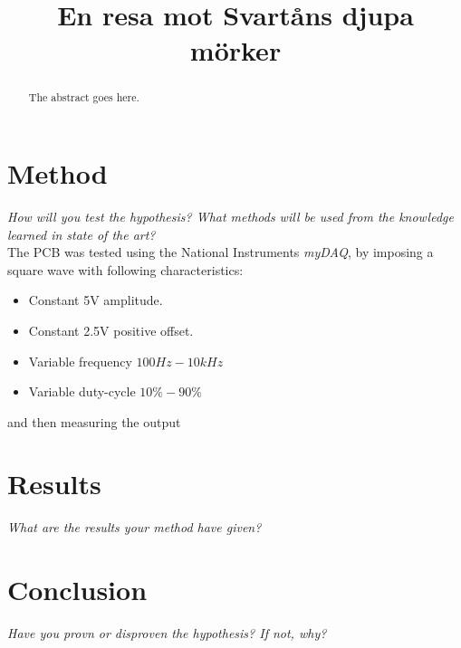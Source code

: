 \documentclass[conference]{IEEEtran}
\begin{document}
\title{En resa mot Svartåns djupa mörker}

\author{
\and
}

\maketitle

\begin{abstract}
The abstract goes here.
\end{abstract}
\section{Method}
\textit{How will you test the hypothesis? What methods will be used from the knowledge learned in state of the art?}
\\The PCB was tested using the National Instruments \textit{myDAQ}, by imposing a square wave with following characteristics:
\begin{itemize}
        \item Constant 5V amplitude.
        \item Constant 2.5V positive offset.
        \item Variable frequency $100Hz-10kHz$
        \item Variable duty-cycle $10\% - 90\%$
\end{itemize}
and then measuring the output
\section{Results}
\textit{What are the results your method have given?}

\section{Conclusion}
\textit{Have you provn or disproven the hypothesis? If not, why?}
\end{document}
